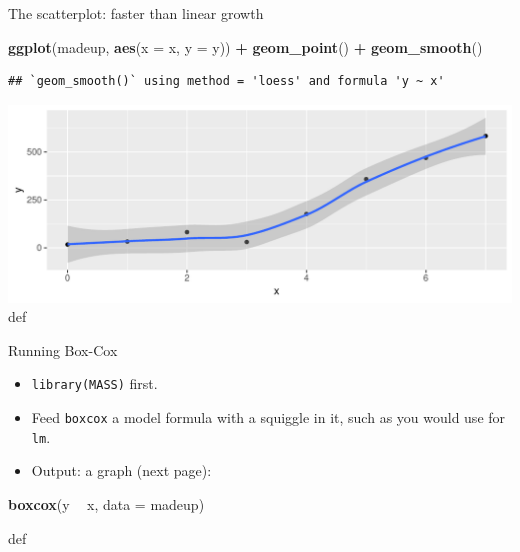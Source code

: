 \documentclass[ignorenonframetext,]{beamer}
\newenvironment{Shaded}{\begin{snugshade}}{\end{snugshade}}
\newcommand{\DataTypeTok}[1]{\textcolor[rgb]{0.13,0.29,0.53}{#1}}
\newcommand{\KeywordTok}[1]{\textcolor[rgb]{0.13,0.29,0.53}{\textbf{#1}}}
\newcommand{\NormalTok}[1]{#1}
\newcommand{\OperatorTok}[1]{\textcolor[rgb]{0.81,0.36,0.00}{\textbf{#1}}}
\newcommand{\StringTok}[1]{\textcolor[rgb]{0.31,0.60,0.02}{#1}}
\begin{document}
\begin{frame}[fragile]{The scatterplot: faster than linear growth}
\protect\hypertarget{the-scatterplot-faster-than-linear-growth}{}

\begin{Shaded}
\begin{Highlighting}[]
\KeywordTok{ggplot}\NormalTok{(madeup, }\KeywordTok{aes}\NormalTok{(}\DataTypeTok{x =}\NormalTok{ x, }\DataTypeTok{y =}\NormalTok{ y)) }\OperatorTok{+}\StringTok{ }\KeywordTok{geom_point}\NormalTok{() }\OperatorTok{+}
\StringTok{  }\KeywordTok{geom_smooth}\NormalTok{()}
\end{Highlighting}
\end{Shaded}

\begin{verbatim}
## `geom_smooth()` using method = 'loess' and formula 'y ~ x'
\end{verbatim}

\includegraphics{figure/dsljhsdjlhf-1.pdf} def

\end{frame}

\begin{frame}[fragile]{Running Box-Cox}
\protect\hypertarget{running-box-cox}{}

\begin{itemize}
\item
  \texttt{library(MASS)} first.
\item
  Feed \texttt{boxcox} a model formula with a squiggle in it, such as
  you would use for \texttt{lm}.
\item
  Output: a graph (next page):
\end{itemize}

\begin{Shaded}
\begin{Highlighting}[]
\KeywordTok{boxcox}\NormalTok{(y }\OperatorTok{~}\StringTok{ }\NormalTok{x, }\DataTypeTok{data =}\NormalTok{ madeup)}
\end{Highlighting}
\end{Shaded}

def

\end{frame}
\end{document}
